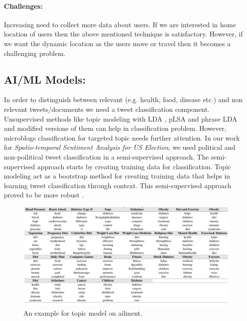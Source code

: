 \vspace{-2mm}
\paragraph{Challenges:}
Increasing need to collect more data about users. If we are interested in home location of users then the above mentioned \cite{compton2014geotagging} technique is satisfactory. However, if we want the dynamic location as the users move or travel then it becomes a challenging problem.


\subsection{AI/ML Models:}
In order to distinguish between relevant (e.g. health, food, disease etc.) and  non relevant tweets/documents we need a tweet classification component. Unsupervised methods like topic modeling with LDA \cite{blei2003latent}, pLSA \cite{hofmann1999probabilistic} and phrase LDA \cite{el2014scalable} and modified versions of them can help in classification problem. However, microblogs classification for targeted topic needs further attention. In our work \cite{paul2017compass} for {\em Spatio-temporal Sentiment Analysis for US Election}, we used political and non-poilitical tweet classification in a semi-supervised approach. The semi-supervised approach starts by creating training data for classification. Topic modeling act as a bootstrap method for creating training data that helps in learning tweet classification through context. This semi-supervised approach proved to be more robust \cite{paul2017compass}.

\begin{figure}[t]
	\includegraphics[width=0.99\linewidth ]{fig/HealthTopicExample.png}
    \vspace{-2mm}
    \caption{An example for topic model on ailment\cite{paul2012model}.}
    \label{fig:topic}
\end{figure}


